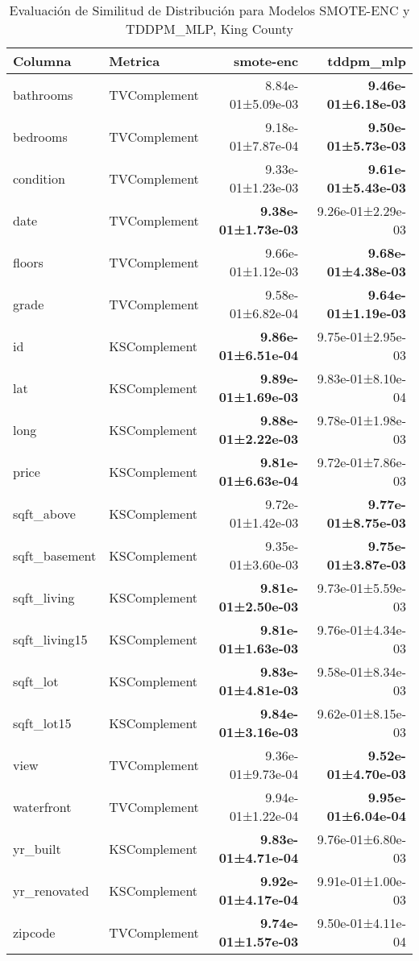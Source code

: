 \begin{table}[H]
\centering
\fontsize{10}{14}\selectfont
\caption{Evaluaci\'on de Similitud de Distribuci\'on para Modelos SMOTE-ENC y TDDPM\_MLP, King County}
\label{table-shape-king county-a}
\begin{tabular}{|l|l|r|r|}
\hline
\rowcolor[gray]{0.8}
Columna & Metrica & smote-enc & tddpm\_mlp \\
\hline bathrooms & TVComplement & 8.84e-01±5.09e-03 & \bfseries 9.46e-01±6.18e-03 \\
\hline bedrooms & TVComplement & 9.18e-01±7.87e-04 & \bfseries 9.50e-01±5.73e-03 \\
\hline condition & TVComplement & 9.33e-01±1.23e-03 & \bfseries 9.61e-01±5.43e-03 \\
\hline date & TVComplement & \bfseries 9.38e-01±1.73e-03 & 9.26e-01±2.29e-03 \\
\hline floors & TVComplement & 9.66e-01±1.12e-03 & \bfseries 9.68e-01±4.38e-03 \\
\hline grade & TVComplement & 9.58e-01±6.82e-04 & \bfseries 9.64e-01±1.19e-03 \\
\hline id & KSComplement & \bfseries 9.86e-01±6.51e-04 & 9.75e-01±2.95e-03 \\
\hline lat & KSComplement & \bfseries 9.89e-01±1.69e-03 & 9.83e-01±8.10e-04 \\
\hline long & KSComplement & \bfseries 9.88e-01±2.22e-03 & 9.78e-01±1.98e-03 \\
\hline price & KSComplement & \bfseries 9.81e-01±6.63e-04 & 9.72e-01±7.86e-03 \\
\hline sqft\_above & KSComplement & 9.72e-01±1.42e-03 & \bfseries 9.77e-01±8.75e-03 \\
\hline sqft\_basement & KSComplement & 9.35e-01±3.60e-03 & \bfseries 9.75e-01±3.87e-03 \\
\hline sqft\_living & KSComplement & \bfseries 9.81e-01±2.50e-03 & 9.73e-01±5.59e-03 \\
\hline sqft\_living15 & KSComplement & \bfseries 9.81e-01±1.63e-03 & 9.76e-01±4.34e-03 \\
\hline sqft\_lot & KSComplement & \bfseries 9.83e-01±4.81e-03 & 9.58e-01±8.34e-03 \\
\hline sqft\_lot15 & KSComplement & \bfseries 9.84e-01±3.16e-03 & 9.62e-01±8.15e-03 \\
\hline view & TVComplement & 9.36e-01±9.73e-04 & \bfseries 9.52e-01±4.70e-03 \\
\hline waterfront & TVComplement & 9.94e-01±1.22e-04 & \bfseries 9.95e-01±6.04e-04 \\
\hline yr\_built & KSComplement & \bfseries 9.83e-01±4.71e-04 & 9.76e-01±6.80e-03 \\
\hline yr\_renovated & KSComplement & \bfseries 9.92e-01±4.17e-04 & 9.91e-01±1.00e-03 \\
\hline zipcode & TVComplement & \bfseries 9.74e-01±1.57e-03 & 9.50e-01±4.11e-04 \\
\hline
\end{tabular}
\end{table}
